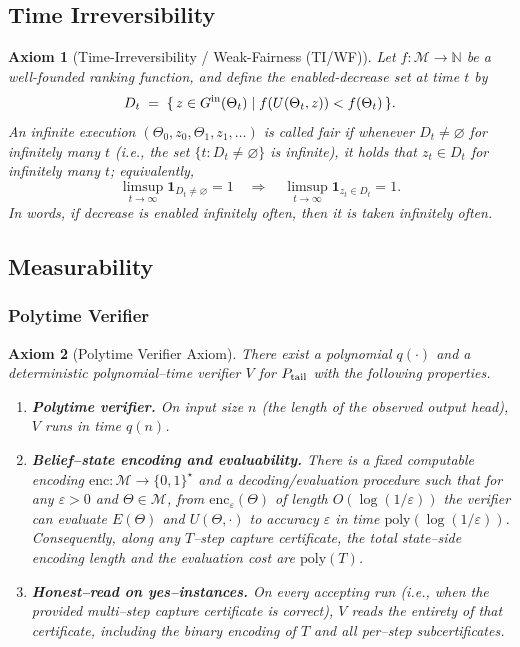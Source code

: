 \documentclass{article}
\theoremstyle{definition}
\theoremstyle{plain}
\newtheorem{axiom}{Axiom}[section]
\begin{document}
\subsection{Time Irreversibility}

\begin{axiom}[Time-Irreversibility / Weak-Fairness (TI/WF)]
Let \(f:\mathcal M\to\mathbb N\) be a well-founded ranking function, and define the enabled-decrease set at time \(t\) by
\[
  D_t \;=\; \{\,z\in G^{\rm in}(\Theta_t)\mid f(U(\Theta_t,z))<f(\Theta_t)\,\}.
\]
An infinite execution \((\Theta_0,z_0,\Theta_1,z_1,\dots)\) is called \emph{fair} if whenever \(D_t\neq\varnothing\) for infinitely many \(t\) (i.e., the set \(\{t: D_t\neq\varnothing\}\) is infinite), it holds that \(z_t\in D_t\) for infinitely many \(t\); equivalently,
\[
\limsup_{t\to\infty} \mathbf{1}_{D_t\neq\varnothing} = 1
\quad\Longrightarrow\quad
\limsup_{t\to\infty} \mathbf{1}_{z_t\in D_t} = 1.
\]
In words, if decrease is enabled infinitely often, then it is taken infinitely often.
\end{axiom}

\subsection{Measurability}
\subsubsection{Polytime Verifier}
\begin{axiom}[Polytime Verifier Axiom]
There exist a polynomial $q(\cdot)$ and a deterministic polynomial–time verifier $V$ for $P_{\rm tail}$ with the following properties.

\begin{enumerate}[label=(V\arabic*)]
  \item \textbf{Polytime verifier.} On input size $n$ (the length of the observed output head), $V$ runs in time $q(n)$.

  \item \textbf{Belief–state encoding and evaluability.} There is a fixed computable encoding $\mathrm{enc}:\mathcal M\to\{0,1\}^\star$ and a decoding/evaluation procedure such that for any $\varepsilon>0$ and $\Theta\in\mathcal M$, from $\mathrm{enc}_\varepsilon(\Theta)$ of length $O(\log(1/\varepsilon))$ the verifier can evaluate $E(\Theta)$ and $U(\Theta,\cdot)$ to accuracy $\varepsilon$ in time $\mathrm{poly}(\log(1/\varepsilon))$. Consequently, along any $T$–step capture certificate, the total state–side encoding length and the evaluation cost are $\mathrm{poly}(T)$.

  \item \textbf{Honest–read on yes–instances.} On every accepting run (i.e., when the provided multi–step capture certificate is correct), $V$ reads the entirety of that certificate, including the binary encoding of $T$ and all per–step subcertificates.
\end{enumerate}
\end{axiom}
\end{document}
